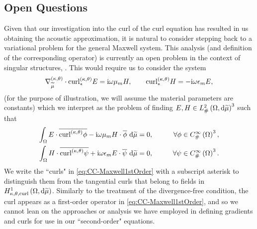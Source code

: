 \subsection{Open Questions} \label{ssec:CC-OpenQuestions}

Given that our investigation into the curl of the curl equation has resulted in us obtaining the acoustic approximation, it is natural to consider stepping back to a variational problem for the general Maxwell system.
This analysis (and definition of the corresponding operator) is currently an open problem in the context of singular structures, .
This would require us to consider the system
\begin{subequations} \label{eq:CC-Maxwell1stOrder}
	\begin{align}
		\nabla^{\left( \kappa, \theta \right)}_{\widetilde{\mu}}\cdot
		\mathrm{curl}_{*}^{\left( \kappa, \theta \right)}E = \mathrm{i}\omega\mu_m H,
		\qquad
		\mathrm{curl}_{*}^{\left( \kappa, \theta \right)}H = -\mathrm{i}\omega\epsilon_m E,
	\end{align}
\end{subequations}
(for the purpose of illustration, we will assume the material parameters are constants) which we interpret as the problem of finding $E,H\in L^2_{\#}\left( \Omega,\mathrm{d} \widetilde{\mu} \right)^3$ such that
\begin{subequations} \label{eq:CC-Maxwell1stOrderVariational}
	\begin{align} 
		\int_{\Omega} E\cdot\overline{\mathrm{curl}_{}^{\left( \kappa, \theta \right)}\phi} - \mathrm{i}\omega\mu_m H\cdot\overline{\phi}  \ \mathrm{d}\widetilde{\mu} &= 0, 
		\qquad &\forall \phi\in C^{\infty}_{\#}\left( \Omega \right)^3, \\
		\int_{\Omega} H\cdot\overline{\mathrm{curl}_{}^{\left( \kappa, \theta \right)}\psi} + \mathrm{i}\omega\epsilon_m E\cdot\overline{\psi}  \ \mathrm{d}\widetilde{\mu} &= 0,
		\qquad &\forall \psi\in C^{\infty}_{\#}\left( \Omega \right)^3.
	\end{align}
\end{subequations}
We write the ``curls" in \eqref{eq:CC-Maxwell1stOrder} with a subscript asterisk to distinguish them from the tangential curls that belong to fields in $H^1_{\kappa,\theta,\mathrm{curl}}\left( \Omega, \mathrm{d}\widetilde{\mu} \right)$.
Similarly to the treatment of the divergence-free condition, the curl appears as a first-order operator in \eqref{eq:CC-Maxwell1stOrder}, and so we cannot lean on the approaches or analysis we have employed in defining gradients and curls for use in our ``second-order" equations.
